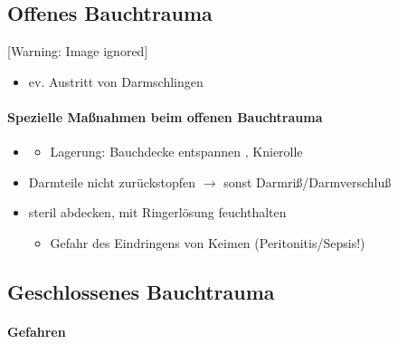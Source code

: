 \subsection{Offenes Bauchtrauma}

\begin{center}
 [Warning: Image ignored] %
\end{center}
\begin{itemize}
\item ev. Austritt von Darmschlingen

\end{itemize}

\begin{gMassnahmenEnv}
    
    \paragraph{Spezielle Maßnahmen beim offenen Bauchtrauma}
    \begin{itemize}
        \item \gTxMassVitBes
        \begin{itemize}
            \item Lagerung: Bauchdecke entspannen , Knierolle
        \end{itemize}
        \item Darmteile nicht  zur\"uckstopfen ${\rightarrow}$ sonst
        Darmri{\ss}/Darmverschlu{\ss}
        \item steril abdecken, mit Ringerl\"osung feuchthalten
        \begin{itemize}
            \item Gefahr des Eindringens von Keimen  (Peritonitis/Sepsis!)
        \end{itemize}
    \end{itemize}
\end{gMassnahmenEnv}


\subsection{Geschlossenes Bauchtrauma}

\paragraph{Gefahren}

